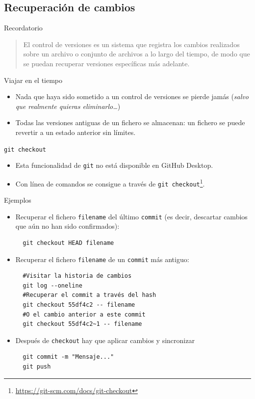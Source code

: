 \documentclass[aspectratio=169, xcolor={usenames,svgnames,dvipsnames}]{beamer}
\begin{document}
\subsection{Recuperación de cambios}
\label{sec:orgf3e72f1}
\begin{frame}[label={sec:orgbadcdd5}]{Recordatorio}
\begin{quote}
El control de versiones es un sistema que \alert{registra los cambios}
realizados sobre un archivo o conjunto de archivos a lo largo del
tiempo, de modo que se puedan \alert{recuperar} versiones específicas más
adelante.
\end{quote}
\begin{block}{Viajar en el tiempo}
\begin{itemize}
\item Nada que haya sido sometido a un control de versiones se pierde jamás (\emph{salvo que realmente quieras eliminarlo\ldots{}})
\item \alert{Todas} las versiones antiguas de un fichero se almacenan: un fichero se puede revertir a un estado anterior sin límites.
\end{itemize}
\end{block}
\end{frame}
\begin{frame}[fragile,label={sec:org10b2b25}]{\texttt{git checkout}}
 \begin{itemize}
\item Esta funcionalidad de \texttt{git} no está disponible en GitHub Desktop.
\item Con línea de comandos se consigue a través de \texttt{git checkout}\footnote{\url{https://git-scm.com/docs/git-checkout}}.
\end{itemize}
\end{frame}
\begin{frame}[fragile,label={sec:orga34e07d}]{Ejemplos}
 \begin{itemize}
\item Recuperar el fichero \texttt{filename} del último \texttt{commit} (es decir, descartar cambios que aún no han sido confirmados):
\lstset{language=sh,label= ,caption= ,captionpos=b,numbers=none}
\begin{lstlisting}
  git checkout HEAD filename
\end{lstlisting}

\item Recuperar el fichero \texttt{filename} de un \texttt{commit} más antiguo:
\lstset{language=sh,label= ,caption= ,captionpos=b,numbers=none}
\begin{lstlisting}
  #Visitar la historia de cambios
  git log --oneline
  #Recuperar el commit a través del hash
  git checkout 55df4c2 -- filename
  #O el cambio anterior a este commit
  git checkout 55df4c2~1 -- filename
\end{lstlisting}

\item Después de \texttt{checkout} hay que aplicar cambios y sincronizar
\lstset{language=sh,label= ,caption= ,captionpos=b,numbers=none}
\begin{lstlisting}
  git commit -m "Mensaje..."
  git push
\end{lstlisting}
\end{itemize}
\end{frame}
\end{document}
